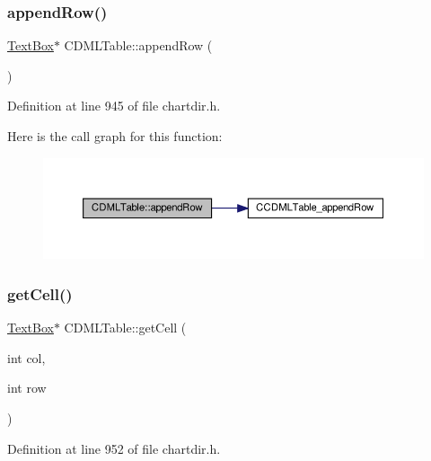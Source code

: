 \subsubsection{\texorpdfstring{append\+Row()}{appendRow()}}
{\footnotesize\ttfamily \hyperlink{class_text_box}{Text\+Box}$\ast$ C\+D\+M\+L\+Table\+::append\+Row (\begin{DoxyParamCaption}{ }\end{DoxyParamCaption})\hspace{0.3cm}{\ttfamily [inline]}}



Definition at line 945 of file chartdir.\+h.

Here is the call graph for this function\+:
\nopagebreak
\begin{figure}[H]
\begin{center}
\leavevmode
\includegraphics[width=350pt]{class_c_d_m_l_table_a1ce86017996573f4c00571e59be500e1_cgraph}
\end{center}
\end{figure}
\mbox{\label{class_c_d_m_l_table_ae4d272ac2aeaaadea380aff21500a176}} 
\subsubsection{\texorpdfstring{get\+Cell()}{getCell()}}
{\footnotesize\ttfamily \hyperlink{class_text_box}{Text\+Box}$\ast$ C\+D\+M\+L\+Table\+::get\+Cell (\begin{DoxyParamCaption}\item[{int}]{col,  }\item[{int}]{row }\end{DoxyParamCaption})\hspace{0.3cm}{\ttfamily [inline]}}



Definition at line 952 of file chartdir.\+h.

